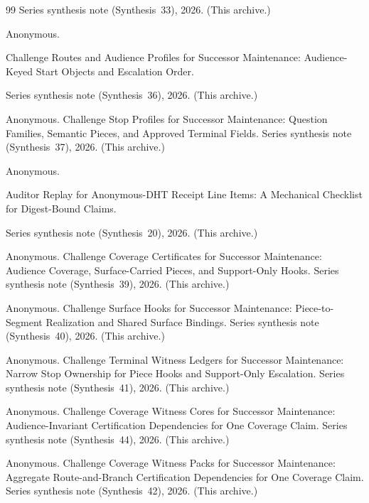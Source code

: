 \documentclass[11pt]{article}
\begin{document}
\begin{thebibliography}{99}
\newblock Series synthesis note (Synthesis~33), 2026. (This archive.)

Anonymous.

\newblock Challenge Routes and Audience Profiles for Successor Maintenance: Audience-Keyed Start Objects and Escalation Order.

\newblock Series synthesis note (Synthesis~36), 2026. (This archive.)

Anonymous.
\newblock Challenge Stop Profiles for Successor Maintenance: Question Families, Semantic Pieces, and Approved Terminal Fields.
\newblock Series synthesis note (Synthesis~37), 2026. (This archive.)

Anonymous.

\newblock Auditor Replay for Anonymous-DHT Receipt Line Items: A Mechanical Checklist for Digest-Bound Claims.

\newblock Series synthesis note (Synthesis~20), 2026. (This archive.)


Anonymous.
\newblock Challenge Coverage Certificates for Successor Maintenance: Audience Coverage, Surface-Carried Pieces, and Support-Only Hooks.
\newblock Series synthesis note (Synthesis~39), 2026. (This archive.)

Anonymous.
\newblock Challenge Surface Hooks for Successor Maintenance: Piece-to-Segment Realization and Shared Surface Bindings.
\newblock Series synthesis note (Synthesis~40), 2026. (This archive.)

Anonymous.
\newblock Challenge Terminal Witness Ledgers for Successor Maintenance: Narrow Stop Ownership for Piece Hooks and Support-Only Escalation.
\newblock Series synthesis note (Synthesis~41), 2026. (This archive.)

Anonymous.
\newblock Challenge Coverage Witness Cores for Successor Maintenance: Audience-Invariant Certification Dependencies for One Coverage Claim.
\newblock Series synthesis note (Synthesis~44), 2026. (This archive.)

Anonymous.
\newblock Challenge Coverage Witness Packs for Successor Maintenance: Aggregate Route-and-Branch Certification Dependencies for One Coverage Claim.
\newblock Series synthesis note (Synthesis~42), 2026. (This archive.)


\end{thebibliography}
\end{document}
